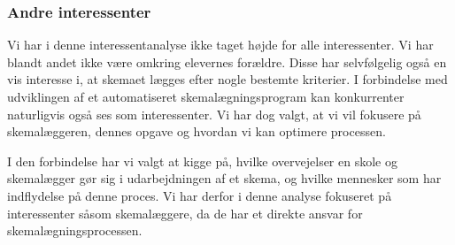 \subsubsection{Andre interessenter}
Vi har i denne interessentanalyse ikke taget højde for alle interessenter. Vi har blandt andet ikke være omkring elevernes forældre. Disse har selvfølgelig også en vis interesse i, at skemaet lægges efter nogle bestemte kriterier. I forbindelse med udviklingen af et automatiseret skemalægningsprogram kan konkurrenter naturligvis også ses som interessenter. Vi har dog valgt, at vi vil fokusere på skemalæggeren, dennes opgave og hvordan vi kan optimere processen.

I den forbindelse har vi valgt at kigge på, hvilke overvejelser en skole og skemalægger gør sig i udarbejdningen af et skema, og hvilke mennesker som har indflydelse på denne proces. Vi har derfor i denne analyse fokuseret på interessenter såsom skemalæggere, da de har et direkte ansvar for skemalægningsprocessen.





